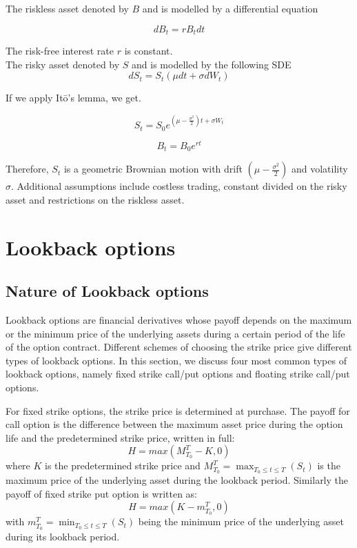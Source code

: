 \documentclass{article}
\begin{document}
The riskless asset denoted by $B$ and is modelled by a differential equation 

\[
dB_t=r B_t dt
\]

The risk-free interest rate $r$ is constant.\\

The risky asset denoted by $S$ and is modelled by the following SDE
\[
dS_t= S_t(\mu dt + \sigma dW_t) 
\]

If we apply It\={o}'s lemma, we get.

\[
S_t= S_0 e^{(\mu- \frac{\sigma^2}{2})t  + \sigma W_t} 
\]

\[
B_t= B_0  e^{rt}
\]

Therefore, $S_t$ is a geometric Brownian motion with drift $(\mu- \frac{\sigma^2}{2})$ and volatility $\sigma$.  Additional assumptions include costless trading, constant divided on the risky asset and restrictions on the riskless asset. \\



\section{Lookback options 
}
\subsection{Nature of Lookback options
}

Lookback options are financial derivatives whose payoff depends on the maximum or the minimum price of the underlying assets during a certain period of the life of the option contract. Different schemes of choosing the strike price give different types of lookback options. In this section, we discuss four most common types of lookback options, namely fixed strike call/put options and floating strike call/put options.

For fixed strike options, the strike price is determined at purchase. The payoff for call option is the difference between the maximum asset price during the option life and the predetermined strike price, written in full:
\[
H=max(M_{T_0}^T - K, 0)
\]
where $K$ is the predetermined strike price and $M_{T_0}^T=\max_{T_0 \leq t \leq T}(S_t)$ is the maximum price of the underlying asset during the lookback period. Similarly the payoff of fixed strike put option is written as:
\[
H=max(K - m_{T_0}^T, 0)
\]
with $m_{T_0}^T=\min_{T_0 \leq t \leq T}(S_t)$ being the minimum price of the underlying asset during its lookback period.
\end{document}
